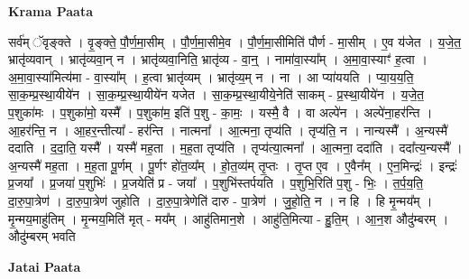 \documentclass[17pt]{extarticle}
\begin{document}
\textbf{Krama Paata} \newline

सर्व॑म् ॅवृङ्क्ते । वृ॒ङ्क्ते॒ पौ॒र्ण॒मा॒सीम् । पौ॒र्ण॒मा॒सीमे॒व । पौ॒र्ण॒मा॒सीमिति॑ पौर्ण - मा॒सीम् । ए॒व य॑जेत । य॒जे॒त॒ भ्रातृ॑व्यवान् । भ्रातृ॑व्यवा॒न् न । भ्रातृ॑व्यवा॒निति॒ भ्रातृ॑व्य - वा॒न्॒ । नामा॑वा॒स्या᳚म् । अ॒मा॒वा॒स्याꣳ॑ ह॒त्वा । अ॒मा॒वा॒स्या॑मित्य॑मा - वा॒स्या᳚म् । ह॒त्वा भ्रातृ॑व्यम् । भ्रातृ॑व्य॒म् न । ना । आ प्या॑ययति । प्या॒य॒य॒ति॒ सा॒क॒म्प्र॒स्था॒यीये॑न । सा॒क॒म्प्र॒स्था॒यीये॑न यजेत । सा॒क॒म्प्र॒स्था॒यीये॒नेति॑ साकम् - प्र॒स्था॒यीये॑न । य॒जे॒त॒ प॒शुका॑मः । प॒शुका॑मो॒ यस्मै᳚ । प॒शुका॑म॒ इति॑ प॒शु - का॒मः॒ । यस्मै॒ वै । वा अल्पे॑न । अल्पे॑ना॒हर॑न्ति । आ॒हर॑न्ति॒ न । आ॒हर॒न्तीत्या᳚ - हर॑न्ति । नात्मना᳚ । आ॒त्मना॒ तृप्य॑ति । तृप्य॑ति॒ न । नान्यस्मै᳚ । अ॒न्यस्मै॑ ददाति । द॒दा॒ति॒ यस्मै᳚ । यस्मै॑ मह॒ता । म॒ह॒ता तृप्य॑ति । तृप्य॑त्या॒त्मना᳚ । आ॒त्मना॒ ददा॑ति । ददा᳚त्य॒न्यस्मै᳚ । अ॒न्यस्मै॑ मह॒ता । म॒ह॒ता पू॒र्णम् । पू॒र्णꣳ हो॑त॒व्य᳚म् । हो॒त॒व्य॑म् तृ॒प्तः । तृ॒प्त ए॒व । ए॒वैन᳚म् । ए॒न॒मिन्द्रः॑ । इन्द्रः॑ प्र॒जया᳚ । प्र॒जया॑ प॒शुभिः॑ । प्र॒जयेति॑ प्र - जया᳚ । प॒शुभि॑स्तर्पयति । प॒शुभि॒रिति॑ प॒शु - भिः॒ । त॒र्प॒य॒ति॒ दा॒रु॒पा॒त्रेण॑ । दा॒रु॒पा॒त्रेण॑ जुहोति । दा॒रु॒पा॒त्रेणेति॑ दारु - पा॒त्रेण॑ । जु॒हो॒ति॒ न । न हि । हि मृ॒न्मय᳚म् । मृ॒न्मय॒माहु॑तिम् । मृ॒न्मय॒मिति॑ मृत् - मय᳚म् । आहु॑तिमान॒शे । आहु॑ति॒मित्या - हु॒ति॒म् । आ॒न॒श औदु॑म्बरम् । 
औदु॑म्बरम् भवति \newline

\textbf{Jatai Paata} \newline
\end{document}
